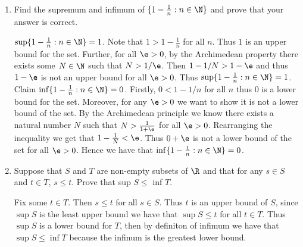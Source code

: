 \documentclass[11pt]{exam}
\begin{document}
\begin{enumerate}
\begin{solution}
\begin{enumerate}
                \end{enumerate} 
            \end{solution}
        \item Find the supremum and infimum of $\{1 - \frac{1}{n}: n \in \N\}$ and prove that your answer is correct.
            \begin{solution}
                $\sup \{1 - \frac{1}{n}: n \in \N\} = 1$. Note that $1 > 1 - \frac{1}{n}$ for all $n$. Thus $1$ is an upper bound for the set. Further, for all $\e > 0$, by the Archimedean property there exists some $N \in \N$ such that $N > 1/\e$. Then $1 - 1 / N > 1 - \e$ and thus $1 - \e$ is not an upper bound for all $\e > 0$. Thus $\sup \{1 - \frac{1}{n}: n \in \N\} = 1$.
                Claim $\inf \{1 - \frac{1}{n}: n \in \N\} = 0$. Firstly, $0 < 1 - 1/n$ for all $n$ thus 0 is a lower bound for the set. Moreover, for any $\e > 0$ we want to show it is not a lower bound of the set. By the Archimedean principle we know there exists a natural number $N$ such that $N > \frac{1}{1 + \e}$ for all $\e > 0$. Rearranging the inequality we get that $1 - \frac{1}{N} < \e$. Thus $0 + \e$ is not a lower bound of the set for all $\e > 0$. Hence we have that $\inf \{1 - \frac{1}{n}: n \in \N\} = 0$.
            \end{solution}
        \item Suppose that $S$ and $T$ are non-empty subsets of $\R$ and that for any $s \in S$ and $t \in T$, $s \leq t$. Prove that sup $S \leq$ inf $T$. 
            \begin{solution}
                Fix some $t \in T$. Then $s \leq t$ for all $s \in S$. Thus $t$ is an upper bound of $S$, since $\sup S$ is the least upper bound we have that $\sup S \leq t$ for all $t \in T$. Thus $\sup S$ is a lower bound for $T$, then by definiton of infimum we have that $\sup S \leq \inf T$ because the infinum is the greatest lower bound. 
            \end{solution}
    \end{enumerate}
\end{document}
